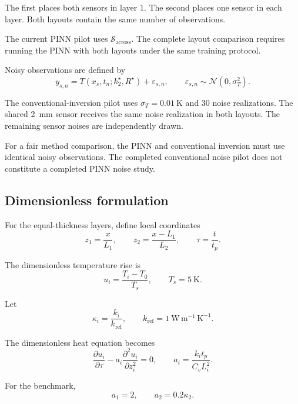 \documentclass[11pt,a4paper]{article}
\begin{document}
The first places both sensors in layer 1.
The second places one sensor in each layer.
Both layouts contain the same number of observations.

The current PINN pilot uses $\mathcal{S}_{\mathrm{across}}$.
The complete layout comparison requires running the PINN
with both layouts under the same training protocol.

Noisy observations are defined by
\begin{equation}
y_{s,n}
=
T(x_s,t_n;k_2^\star,R^\star)
+
\varepsilon_{s,n},
\qquad
\varepsilon_{s,n}\sim
\mathcal{N}(0,\sigma_T^2).
\label{eq:noise}
\end{equation}

The conventional-inversion pilot uses
$\sigma_T=0.01~\mathrm{K}$ and 30 noise realizations.
The shared 2~mm sensor receives the same noise realization
in both layouts. The remaining sensor noises are independently
drawn.

For a fair method comparison, the PINN and conventional
inversion must use identical noisy observations.
The completed conventional noise pilot does not constitute
a completed PINN noise study.

\subsection{Dimensionless formulation}

For the equal-thickness layers, define local coordinates
\begin{equation}
z_1=\frac{x}{L_1},
\qquad
z_2=\frac{x-L_1}{L_2},
\qquad
\tau=\frac{t}{t_p}.
\end{equation}

The dimensionless temperature rise is
\begin{equation}
u_i=\frac{T_i-T_0}{T_s},
\qquad T_s=5~\mathrm{K}.
\end{equation}

Let
\begin{equation}
\kappa_i=\frac{k_i}{k_{\mathrm{ref}}},
\qquad
k_{\mathrm{ref}}=1~\mathrm{W\,m^{-1}\,K^{-1}}.
\end{equation}

The dimensionless heat equation becomes
\begin{equation}
\frac{\partial u_i}{\partial\tau}
-
a_i\frac{\partial^2u_i}{\partial z_i^2}
=0,
\qquad
a_i=\frac{k_it_p}{C_vL_i^2}.
\end{equation}

For the benchmark,
\begin{equation}
a_1=2,
\qquad
a_2=0.2\kappa_2.
\end{equation}
\end{document}
